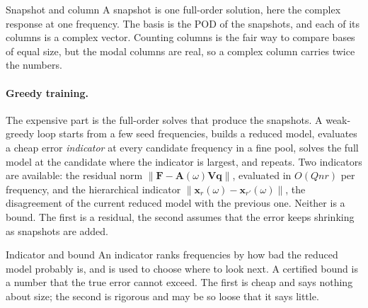 \begin{sidenote}{Snapshot and column}
A snapshot is one full-order solution, here the complex response at one frequency. The basis is the POD of the snapshots, and each of its columns is a complex vector. Counting columns is the fair way to compare bases of equal size, but the modal columns are real, so a complex column carries twice the numbers.
\end{sidenote}

\paragraph{Greedy training.}
The expensive part is the full-order solves that produce the snapshots. A weak-greedy loop starts from a few seed frequencies, builds a reduced model, evaluates a cheap error \emph{indicator} at every candidate frequency in a fine pool, solves the full model at the candidate where the indicator is largest, and repeats. Two indicators are available: the residual norm $\|\bm F-\bm A(\omega)\bm V\bm q\|$, evaluated in $O(Qnr)$ per frequency, and the hierarchical indicator $\|\bm x_r(\omega)-\bm x_{r'}(\omega)\|$, the disagreement of the current reduced model with the previous one. Neither is a bound. The first is a residual, the second assumes that the error keeps shrinking as snapshots are added.

\begin{sidenote}{Indicator and bound}
An indicator ranks frequencies by how bad the reduced model probably is, and is used to choose where to look next. A certified bound is a number that the true error cannot exceed. The first is cheap and says nothing about size; the second is rigorous and may be so loose that it says little.
\end{sidenote}

